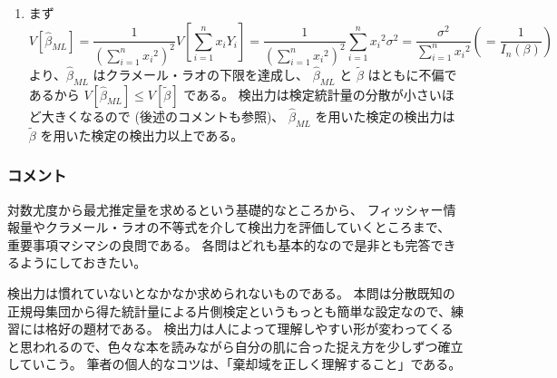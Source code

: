 \documentclass[./main.tex]{subfiles}
\begin{document}
\begin{enumerate}
        \item まず
        \begin{equation*}
            V [\hat{\beta}_{ML}]
                = \frac{1}{ \left( \sum_{i=1}^n {x_i}^2 \right)^2} V \left[ \sum_{i=1}^n x_i Y_i \right]
                = \frac{1}{ \left( \sum_{i=1}^n {x_i}^2 \right)^2} \sum_{i=1}^n {x_i}^2 \sigma^2
                = \frac{\sigma^2}{\sum_{i=1}^n {x_i}^2}
                \left( = \frac{1}{I_n (\beta)} \right)
        \end{equation*}
        より、$\hat{\beta}_{ML}$ はクラメール・ラオの下限を達成し、
        $\hat{\beta}_{ML}$ と $\tilde{\beta}$ はともに不偏であるから
        $V [\hat{\beta}_{ML}] \leq V [\tilde{\beta}]$ である。
        検出力は検定統計量の分散が小さいほど大きくなるので (後述のコメントも参照)、
        $\hat{\beta}_{ML}$ を用いた検定の検出力は $\tilde{\beta}$ を用いた検定の検出力以上である。

    \end{enumerate}


    \subsubsection*{コメント}
        
    対数尤度から最尤推定量を求めるという基礎的なところから、
    フィッシャー情報量やクラメール・ラオの不等式を介して検出力を評価していくところまで、
    重要事項マシマシの良問である。
    各問はどれも基本的なので是非とも完答できるようにしておきたい。

    検出力は慣れていないとなかなか求められないものである。
    本問は分散既知の正規母集団から得た統計量による片側検定というもっとも簡単な設定なので、練習には格好の題材である。
    検出力は人によって理解しやすい形が変わってくると思われるので、色々な本を読みながら自分の肌に合った捉え方を少しずつ確立していこう。
    筆者の個人的なコツは、「棄却域を正しく理解すること」である。
\end{document}

